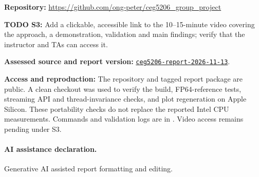\documentclass[11pt,a4paper]{article}
\newcommand{\todo}[2]{\par\smallskip\begingroup\color{red!65!black}\raggedright\noindent\textbf{TODO #1:} #2\par\endgroup\smallskip}
\begin{document}
\noindent\textbf{Repository:} \url{https://github.com/ong-peter/ceg5206_group_project}\par
\todo{S3}{Add a clickable, accessible link to the 10--15-minute video covering
the approach, a demonstration, validation and main findings; verify that the instructor and TAs can access it.}
\noindent\textbf{Assessed source and report version:} \href{https://github.com/ong-peter/ceg5206_group_project/tree/ceg5206-report-2026-11-13}{\texttt{ceg5206-report-2026-11-13}}.\par
\noindent\textbf{Access and reproduction:} The repository and tagged report package are public. A clean checkout was used to verify the build, FP64-reference tests, streaming API and thread-invariance checks, and plot regeneration on Apple Silicon. These portability checks do not replace the reported Intel CPU measurements. Commands and validation logs are in . Video access remains pending under S3.\par

\paragraph{AI assistance declaration.}
Generative AI assisted report formatting and editing.
\end{document}
